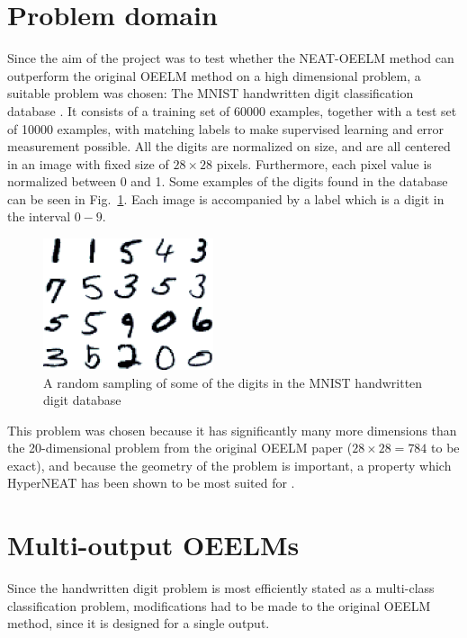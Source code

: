 \documentclass[a4paper]{article}
\numberwithin{equation}{section}
\begin{document}
\section{Problem domain} %
Since the aim of the project was to test whether the NEAT-OEELM method can
outperform the original OEELM method on a high dimensional problem, a suitable
problem was chosen: The MNIST handwritten digit classification database
\cite{lecun1998gradient}. It consists of a training set of 60000 examples,
together with a test set of 10000 examples, with matching labels to make
supervised learning and error measurement possible. All the digits are
normalized on size, and are all centered in an image with fixed size of
$28\times28$ pixels. Furthermore, each pixel value is normalized between 0 and
1. Some examples of the digits found in the database can be seen in
Fig.~\ref{fig:mnistexamples}. Each image is accompanied by a label which is a
digit in the interval $0 - 9$.

\begin{figure}[ht]%
    \centering
    \includegraphics[width=5cm]{figs/mnistexamples}
    \caption{A random sampling of some of the digits in the MNIST handwritten
    digit database}%
    \label{fig:mnistexamples}%
\end{figure}

This problem was chosen because it has significantly many more dimensions than
the 20-dimensional problem from the original OEELM paper
\cite{auerbach2014online} ($28\times28=784$ to be exact), and because the
geometry of the problem is important, a property which HyperNEAT has been shown
to be most suited for \cite{clune2009sensitivity}. 

\section{Multi-output OEELMs}
Since the handwritten digit problem is most efficiently stated as a multi-class
classification problem, modifications had to be made to the original OEELM
method, since it is designed for a single output. 
\end{document}
